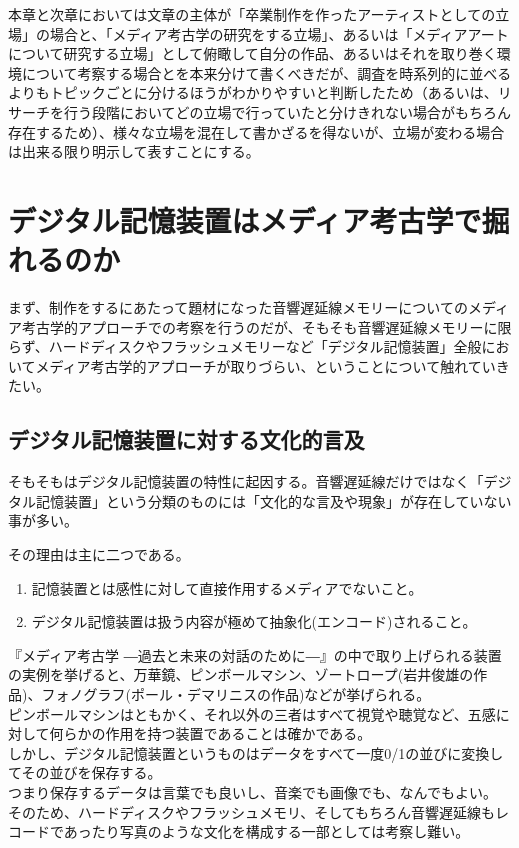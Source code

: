 \documentclass[a4paper,report]{jsbook}
\begin{document}
本章と次章においては文章の主体が「卒業制作を作ったアーティストとしての立場」の場合と、「メディア考古学の研究をする立場」、あるいは「メディアアートについて研究する立場」として俯瞰して自分の作品、あるいはそれを取り巻く環境について考察する場合とを本来分けて書くべきだが、調査を時系列的に並べるよりもトピックごとに分けるほうがわかりやすいと判断したため（あるいは、リサーチを行う段階においてどの立場で行っていたと分けきれない場合がもちろん存在するため）、様々な立場を混在して書かざるを得ないが、立場が変わる場合は出来る限り明示して表すことにする。

\section{デジタル記憶装置はメディア考古学で掘れるのか}\label{ux30c7ux30b8ux30bfux30ebux8a18ux61b6ux88c5ux7f6eux306fux30e1ux30c7ux30a3ux30a2ux8003ux53e4ux5b66ux3067ux6398ux308cux308bux306eux304b}

まず、制作をするにあたって題材になった音響遅延線メモリーについてのメディア考古学的アプローチでの考察を行うのだが、そもそも音響遅延線メモリーに限らず、ハードディスクやフラッシュメモリーなど「デジタル記憶装置」全般においてメディア考古学的アプローチが取りづらい、ということについて触れていきたい。

\subsection{デジタル記憶装置に対する文化的言及}\label{ux30c7ux30b8ux30bfux30ebux8a18ux61b6ux88c5ux7f6eux306bux5bfeux3059ux308bux6587ux5316ux7684ux8a00ux53ca}

そもそもはデジタル記憶装置の特性に起因する。音響遅延線だけではなく「デジタル記憶装置」という分類のものには「文化的な言及や現象」が存在していない事が多い。

その理由は主に二つである。

\begin{enumerate}
\def\labelenumi{\arabic{enumi}.}
\tightlist
\item
  記憶装置とは感性に対して直接作用するメディアでないこと。
\item
  デジタル記憶装置は扱う内容が極めて抽象化(エンコード)されること。
\end{enumerate}

『メディア考古学
―過去と未来の対話のために―』の中で取り上げられる装置の実例を挙げると、万華鏡、ピンボールマシン、ゾートロープ(岩井俊雄の作品)、フォノグラフ(ポール・デマリニスの作品)などが挙げられる。\\
ピンボールマシンはともかく、それ以外の三者はすべて視覚や聴覚など、五感に対して何らかの作用を持つ装置であることは確かである。\\
しかし、デジタル記憶装置というものはデータをすべて一度0/1の並びに変換してその並びを保存する。\\
つまり保存するデータは言葉でも良いし、音楽でも画像でも、なんでもよい。\\
そのため、ハードディスクやフラッシュメモリ、そしてもちろん音響遅延線もレコードであったり写真のような文化を構成する一部としては考察し難い。
\end{document}
